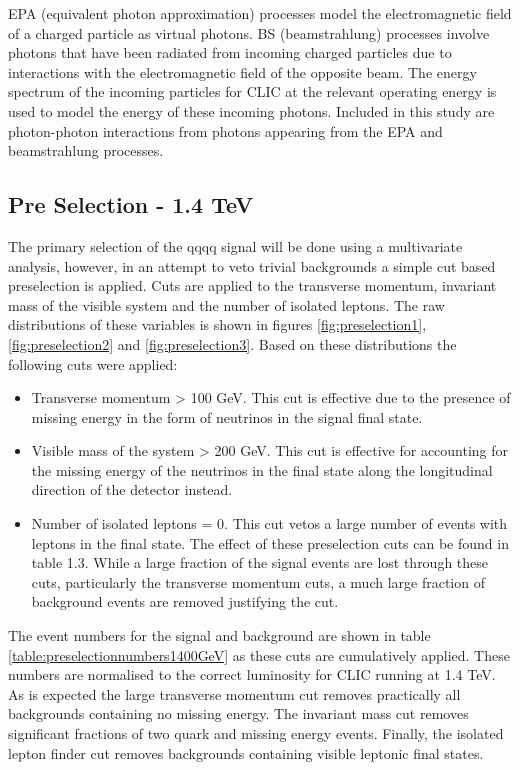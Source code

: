 EPA (equivalent photon approximation) processes model the electromagnetic field of a charged particle as virtual photons.  BS (beamstrahlung) processes involve photons that have been radiated from incoming charged particles due to interactions with the electromagnetic field of the opposite beam.   The energy spectrum of the incoming particles for CLIC at the relevant operating energy is used to model the energy of these incoming photons.  Included in this study are photon-photon interactions from photons appearing from the EPA and beamstrahlung processes.

\subsection{Pre Selection - 1.4 TeV}
The primary selection of the \nu{\nu}qqqq signal will be done using a multivariate analysis, however, in an attempt to veto trivial backgrounds a simple cut based preselection is applied. Cuts are applied to the transverse momentum, invariant mass of the visible system and the number of isolated leptons. The raw distributions of these variables is
shown in figures \ref{fig:preselection1}, \ref{fig:preselection2} and \ref{fig:preselection3}. Based on these distributions the following cuts were applied:

\begin{itemize}
\item Transverse momentum > 100 GeV. This cut is effective due to the presence of missing energy in the form of neutrinos in the signal final state.
\item Visible mass of the system > 200 GeV. This cut is effective for accounting for the missing energy of the neutrinos in the final state along the longitudinal direction of the detector instead.
\item Number of isolated leptons = 0. This cut vetos a large number of events with leptons in the final state.
The effect of these preselection cuts can be found in table 1.3. While a large fraction of the signal events are lost through these cuts, particularly the transverse momentum cuts, a much large fraction of background events are removed justifying the cut.
\end{itemize}

The event numbers for the signal and background are shown in table \ref{table:preselectionnumbers1400GeV} as these cuts are cumulatively applied.  These numbers are normalised to the correct luminosity for CLIC running at 1.4 TeV.  As is expected the large transverse momentum cut removes practically all backgrounds containing no missing energy.  The invariant mass cut removes significant fractions of two quark and missing energy events.  Finally, the isolated lepton finder cut removes backgrounds containing visible leptonic final states.  

